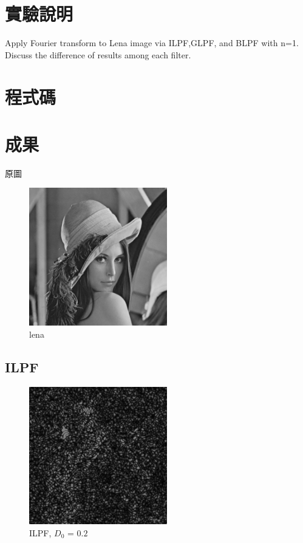 \documentclass[conference]{IEEEtran}
\begin{document}


\section{實驗說明}
Apply Fourier transform to Lena image via ILPF,GLPF, and BLPF with n=1. Discuss the difference of results among each filter.

\section{程式碼}


\section{成果}
原圖

\begin{figure}[H]
\centerline{\includegraphics[width=6cm]{lena.png}}
\caption{lena}
\label{lena}
\end{figure}

\subsection{ILPF}

\begin{figure}[H]
\centerline{\includegraphics[width=6cm]{ILPF0_2.jpg}}
\caption{ILPF, $D_0$ = $0.2$}
\label{ILPF0.2}
\end{figure}
\end{document}

